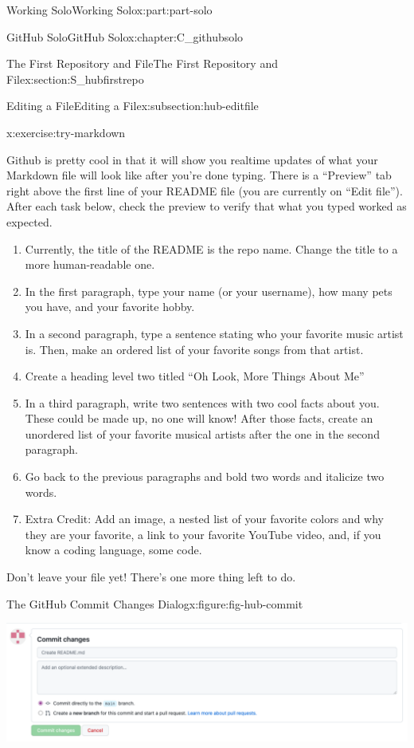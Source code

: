 \documentclass[oneside,10pt,]{book}
\begin{document}
\begin{partptx}{Working Solo}{}{Working Solo}{}{}{x:part:part-solo}
\begin{chapterptx}{GitHub Solo}{}{GitHub Solo}{}{}{x:chapter:C_githubsolo}
\begin{sectionptx}{The First Repository and File}{}{The First Repository and File}{}{}{x:section:S_hubfirstrepo}
\begin{subsectionptx}{Editing a File}{}{Editing a File}{}{}{x:subsection:hub-editfile}
\begin{inlineexercise}{}{x:exercise:try-markdown}
\par
Github is pretty cool in that it will show you realtime updates of what your Markdown file will look like after you're done typing. There is a ``Preview'' tab right above the first line of your README file (you are currently on ``Edit file''). After each task below, check the preview to verify that what you typed worked as expected.%
\begin{enumerate}[font=\bfseries,label=(\alph*),ref=\alph*]
\item{}Currently, the title of the README is the repo name. Change the title to a more human-readable one.%
\item{}In the first paragraph, type your name (or your username), how many pets you have, and your favorite hobby.%
\item{}In a second paragraph, type a sentence stating who your favorite music artist is. Then, make an ordered list of your favorite songs from that artist.%
\item{}Create a heading level two titled ``Oh Look, More Things About Me''%
\item{}In a third paragraph, write two sentences with two cool facts about you. These could be made up, no one will know! After those facts, create an unordered list of your favorite musical artists after the one in the second paragraph.%
\item{}Go back to the previous paragraphs and bold two words and italicize two words.%
\item{}Extra Credit: Add an image, a nested list of your favorite colors and why they are your favorite, a link to your favorite YouTube video, and, if you know a coding language, some code.%
\end{enumerate}
Don't leave your file yet! There's one more thing left to do.%
\end{inlineexercise}%
%
\begin{figureptx}{The GitHub Commit Changes Dialog}{x:figure:fig-hub-commit}{}%
\begin{image}{0.05}{0.9}{0.05}%
\includegraphics[width=\linewidth]{external/hub_commit.pdf}

\end{image}
\end{figureptx}
\end{subsectionptx}
\end{sectionptx}
\end{chapterptx}
\end{partptx}
\end{document}
